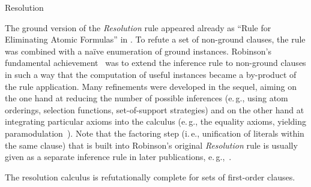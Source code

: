 \begin{entry}{Resolution}
\begin{history}
The ground version of the \textit{Resolution} rule appeared already
as ``Rule for Eliminating Atomic Formulas'' in
\cite{DavisPutnam1960JACM}.
To refute a set of non-ground clauses,
the rule was combined with a na{\"i}ve enumeration of ground instances.
Robinson's fundamental achievement~\cite{Robinson1965JACM}
was to extend the inference rule
to non-ground clauses in such a way that
the computation of useful instances became a by-product of the rule
application.
Many refinements were developed in the sequel,
aiming on the one hand at reducing the number of possible inferences
(e.\,g., using atom orderings, selection functions, set-of-support strategies)
and on the other hand at integrating particular axioms
into the calculus
(e.\,g., the equality axioms, yielding paramodulation~).
Note that the factoring step (i.\,e., unification of literals
within the same clause) that is built into Robinson's original
\textit{Resolution} rule is usually given as a separate inference
rule in later publications, e.\,g.,~.

\end{history}

\begin{technicalities}
The resolution calculus is refutationally complete for
sets of first-order clauses.
\end{technicalities}



%
%
%
%
%
%
% 
%





\end{entry}
